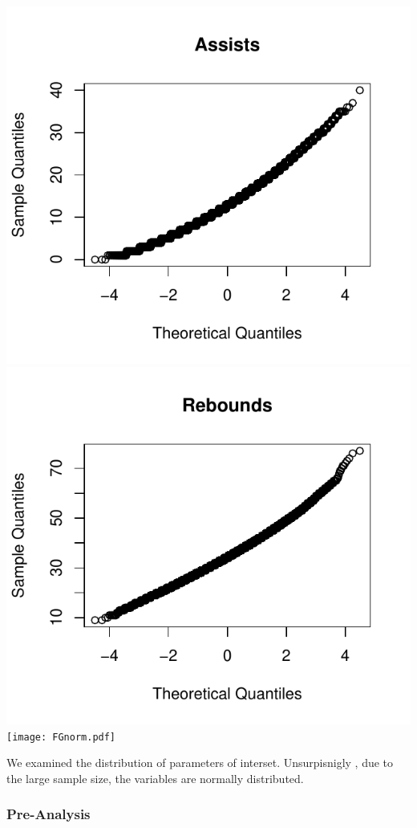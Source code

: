 \documentclass[11pt]{beamer}
\begin{document}
\begin{frame}
\begin{center}
	\includegraphics[scale=0.33]{assnorm.pdf}
	\includegraphics[scale=0.33]{rbnorm.pdf}
	\texttt{[image: FGnorm.pdf]} 
\end{center}
\footnotesize\center We examined the distribution of parameters of interset. Unsurpisnigly , due to the large sample size, the variables are normally distributed.
\frametitle{{\textbf{\huge Pre-Analysis}}}
\end{frame}
\end{document}
